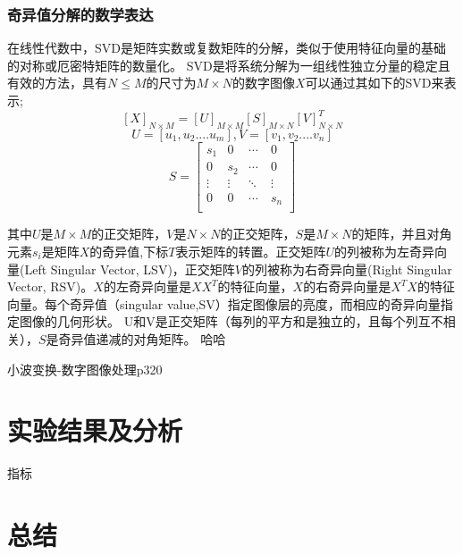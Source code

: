 \documentclass[12pt]{book}
\begin{document}
			\subsection{奇异值分解的数学表达}在线性代数中，SVD是矩阵实数或复数矩阵的分解，类似于使用特征向量的基础的对称或厄密特矩阵的数量化。 SVD是将系统分解为一组线性独立分量的稳定且有效的方法，具有$N \leq M$的尺寸为$M×N$的数字图像$X$可以通过其如下的SVD来表示;
\begin{equation}	\left[ X \right] _{N×M}=\left[ U \right] _{M×M} \left[ S \right] _{M×N} \left[ V \right] ^T_{N×N}	\end{equation}			
\[ U=[u_1,u_2....u_m],	V=[v_1,v_2....v_n] \]
\[
S
=\begin{bmatrix}
s_1  &  0  & \cdots\ &0\\
0  &  s_2  & \cdots\ & 0\\
 \vdots   & \vdots & \ddots  & \vdots  \\
 0 & 0  & \cdots\ & s_n\\
\end{bmatrix}
\]

其中$U$是$M×M$的正交矩阵，$V$是$N×N$的正交矩阵，$S$是$M×N$的矩阵，并且对角元素$s_i$是矩阵$X$的奇异值,下标$T$表示矩阵的转置。正交矩阵$U$的列被称为左奇异向量(Left Singular Vector, LSV)，正交矩阵$V$的列被称为右奇异向量(Right Singular Vector, RSV)。$X$的左奇异向量是$XX^T$的特征向量，$X$的右奇异向量是$X^TX$的特征向量。每个奇异值（singular value,SV）指定图像层的亮度，而相应的奇异向量指定图像的几何形状。 U和V是正交矩阵（每列的平方和是独立的，且每个列互不相关），$S$是奇异值递减的对角矩阵。%
哈哈

		小波变换-数字图像处理p320
	\chapter{实验结果及分析}指标

	\chapter{总结}
\end{document}
